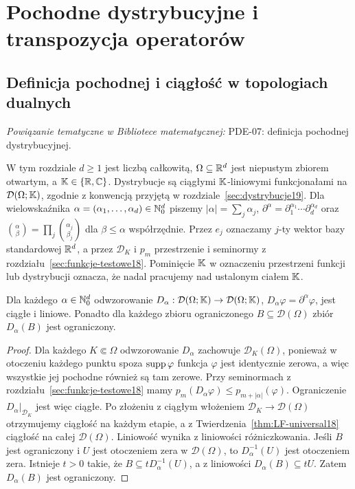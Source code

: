 
\section{Pochodne dystrybucyjne i transpozycja operatorów}
\label{sec:pochodne20}

\providecommand{\atlasref}[2]{#2}


\subsection{Definicja pochodnej i ciągłość w topologiach dualnych}

\noindent\emph{Powiązanie tematyczne w Bibliotece matematycznej:} \atlasref{PDE-07::def:pde7-derivative}{PDE-07: definicja pochodnej dystrybucyjnej}.


W tym rozdziale $d\ge1$ jest liczbą całkowitą,
$\Omega\subseteq\mathbb R^d$ jest niepustym zbiorem otwartym,
a $\mathbb K\in\{\mathbb R,\mathbb C\}$. Dystrybucje są
ciągłymi $\mathbb K$-liniowymi funkcjonałami na $\mathcal D(\Omega;\mathbb K)$, zgodnie
z konwencją przyjętą w rozdziale~\ref{sec:dystrybucje19}.
Dla wielowskaźnika $\alpha=(\alpha_1,\ldots,\alpha_d)\in\mathbb N_0^d$
piszemy $|\alpha|=\sum_j\alpha_j$,
$\partial^\alpha=\partial_1^{\alpha_1}\cdots\partial_d^{\alpha_d}$
oraz $\binom\alpha\beta=\prod_j\binom{\alpha_j}{\beta_j}$
dla $\beta\le\alpha$ współrzędnie. Przez $e_j$ oznaczamy
$j$-ty wektor bazy standardowej $\mathbb R^d$, a przez $\mathcal D_K$
i $p_m$ przestrzenie i seminormy z rozdziału~\ref{sec:funkcje-testowe18}.
Pominięcie $\mathbb K$ w oznaczeniu przestrzeni funkcji lub dystrybucji
oznacza, że nadal pracujemy nad ustalonym ciałem $\mathbb K$.

\begin{lemat}
\label{lem:test-derivative20}
Dla każdego $\alpha\in\mathbb N_0^d$ odwzorowanie
$D_\alpha:\mathcal D(\Omega;\mathbb K)\to\mathcal D(\Omega;\mathbb K)$,
$D_\alpha\varphi=\partial^\alpha\varphi$, jest ciągłe i liniowe.
Ponadto dla każdego zbioru ograniczonego $B\subseteq\mathcal D(\Omega)$
zbiór $D_\alpha(B)$ jest ograniczony.
\end{lemat}
\begin{proof}
Dla każdego $K\Subset\Omega$ odwzorowanie $D_\alpha$ zachowuje
$\mathcal D_K(\Omega)$, ponieważ w otoczeniu każdego punktu
spoza $\operatorname{supp}\varphi$ funkcja $\varphi$ jest identycznie zerowa,
a więc wszystkie jej pochodne również są tam zerowe.
Przy seminormach z rozdziału~\ref{sec:funkcje-testowe18} mamy
$p_m(D_\alpha\varphi)\le p_{m+|\alpha|}(\varphi)$.
Ograniczenie $D_\alpha|_{\mathcal D_K}$ jest więc ciągłe.
Po złożeniu z ciągłym włożeniem $\mathcal D_K\to\mathcal D(\Omega)$
otrzymujemy ciągłość na każdym etapie, a z
Twierdzenia~\ref{thm:LF-universal18} ciągłość na całej $\mathcal D(\Omega)$.
Liniowość wynika z liniowości różniczkowania.
Jeśli $B$ jest ograniczony i $U$ jest otoczeniem zera
w $\mathcal D(\Omega)$, to $D_\alpha^{-1}(U)$ jest
otoczeniem zera. Istnieje $t>0$ takie, że
$B\subseteq tD_\alpha^{-1}(U)$, a z liniowości
$D_\alpha(B)\subseteq tU$. Zatem $D_\alpha(B)$ jest ograniczony.
\end{proof}

